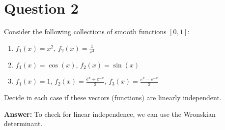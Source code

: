 \documentclass{article}
\begin{document}
\newpage

\section*{Question 2}
Consider the following collections of smooth functions $[0,1]$:
\begin{enumerate}
    \item $f_1(x) = x^2$, $f_2(x) = \frac{1}{x^2}$
    \item $f_1(x) = \cos(x)$, $f_2(x) = \sin(x)$
    \item $f_1(x) = 1$, $f_2(x) = \frac{e^x + e^{-x}}{2}$, $f_3(x) = \frac{e^x - e^{-x}}{2}$
\end{enumerate}
Decide in each case if these vectors (functions) are linearly independent.

\medskip
\noindent
\textbf{Answer:} To check for linear independence, we can use the Wronskian determinant.
\end{document}
